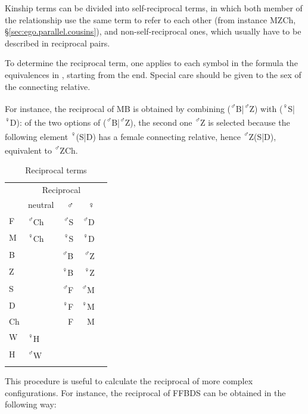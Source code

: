 Kinship terms can be divided into self-reciprocal terms, in which both member of the relationship use the same term to refer to each other (from instance  MZCh, §\ref{sec:ego.parallel.cousins}), and non-self-reciprocal ones, which usually have to be described in reciprocal pairs. 

To determine the reciprocal term, one applies to each symbol in the formula the equivalences in , starting from the end. Special care should be given to the sex of the connecting relative. 

For instance, the reciprocal of MB is obtained by combining (\textsuperscript{♂}B|\textsuperscript{♂}Z) with (\textsuperscript{♀}S|\textsuperscript{♀}D): of the two options of (\textsuperscript{♂}B|\textsuperscript{♂}Z), the second one \textsuperscript{♂}Z is selected because the following element \textsuperscript{♀}(S|D) has a female connecting relative, hence \textsuperscript{♂}Z(S|D), equivalent to  \textsuperscript{♂}ZCh.

 

\begin{table}
\caption{Reciprocal terms} \label{tab:kinship.reciprocal}
\begin{tabular}{Xlrrr}
\lsptoprule
& \multicolumn{3}{c}{Reciprocal} \\
   & neutral &♂   & ♀  \\
 \midrule
F &\textsuperscript{♂}Ch &\textsuperscript{♂}S & \textsuperscript{♂}D \\
M &\textsuperscript{♀}Ch & \textsuperscript{♀}S & \textsuperscript{♀}D \\
 \tablevspace
B & &\textsuperscript{♂}B & \textsuperscript{♂}Z \\
Z & &\textsuperscript{♀}B & \textsuperscript{♀}Z   \\
 \tablevspace
S & &\textsuperscript{♂}F & \textsuperscript{♂}M \\
D & &\textsuperscript{♀}F & \textsuperscript{♀}M   \\
Ch &&F &  M   \\
 \tablevspace
W &   \textsuperscript{♀}H   \\
H &    \textsuperscript{♂}W    \\
\lspbottomrule
\end{tabular}
\end{table}

This procedure is useful to calculate the reciprocal of more complex configurations. For instance, the reciprocal of FFBDS can be obtained in the following way:


